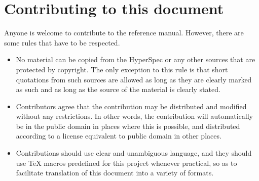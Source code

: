 \chapter{Contributing to this document}
\label{app-contributing}

Anyone is welcome to contribute to the \commonlisp{} reference manual.
However, there are some rules that have to be respected.

\begin{itemize}
\item No material can be copied from the HyperSpec or any other
  sources that are protected by copyright.  The only exception to this
  rule is that short quotations from such sources are allowed as long
  as they are clearly marked as such and as long as the source of the
  material is clearly stated.
\item Contributors agree that the contribution may be distributed and
  modified without any restrictions.  In other words, the contribution
  will automatically be in the public domain in places where this is
  possible, and distributed according to a license equivalent to
  public domain in other places. 
\item Contributions should use clear and unambiguous language, and
  they should use TeX macros predefined for this project whenever
  practical, so as to facilitate translation of this document into a
  variety of formats. 
\end{itemize}
